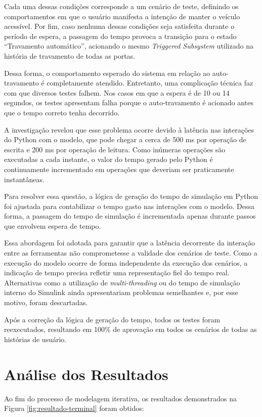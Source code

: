 Cada uma dessas condições corresponde a um cenário de teste, definindo os comportamentos em que o usuário manifesta a intenção de manter o veículo acessível. Por fim, 
caso nenhuma dessas condições seja satisfeita durante o período de espera, a passagem do tempo provoca a transição para o estado ``Travamento automático'', acionando 
o mesmo \textit{Triggered Subsystem} utilizado na história de travamento de todas as portas.

Dessa forma, o comportamento esperado do sistema em relação ao auto-travamento é completamente atendido. Entretanto, uma complicação técnica faz com que diversos 
testes falhem. Nos casos em que a espera é de 10 ou 14 segundos, os testes apresentam falha porque o auto-travamento é acionado antes que o tempo correto tenha decorrido.

A investigação revelou que esse problema ocorre devido à latência nas interações do Python com o modelo, que pode chegar a cerca de 500 ms por operação de escrita e 
200 ms por operação de leitura. Como inúmeras operações são executadas a cada instante, o valor do tempo gerado pelo Python é continuamente incrementado em operações 
que deveriam ser praticamente instantâneas.

Para resolver essa questão, a lógica de geração do tempo de simulação em Python foi ajustada para contabilizar o tempo gasto nas interações com o modelo. Dessa forma, 
a passagem do tempo de simulação é incrementada apenas durante passos que envolvem espera de tempo.

Essa abordagem foi adotada para garantir que a latência decorrente da interação entre as ferramentas não comprometesse a validade dos cenários de teste. Como a execução 
do modelo ocorre de forma independente da execução dos cenários, a indicação de tempo precisa refletir uma representação fiel do tempo real. Alternativas como a 
utilização de \textit{multi-threading} ou do tempo de simulação interno do Simulink ainda apresentariam problemas semelhantes e, por esse motivo, foram descartadas.

Após a correção da lógica de geração do tempo, todos os testes foram reexecutados, resultando em 100\% de aprovação em todos os cenários de todas as histórias de usuário.

\section{Análise dos Resultados}
\label{sbs:etapa6}

Ao fim do processo de modelagem iterativa, os resultados demonstrados na Figura \ref{fig:resultado-terminal} foram obtidos: 

